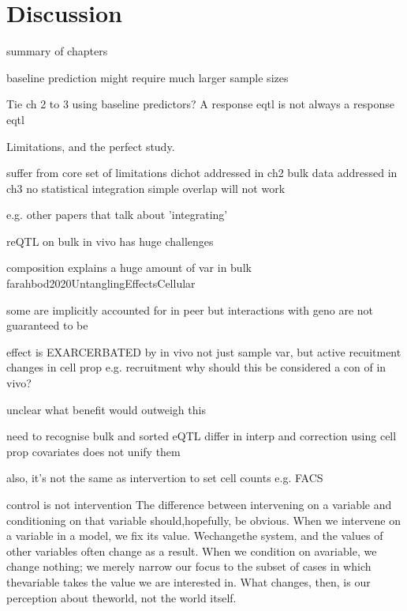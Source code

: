 %
%

\chapter{Discussion}

\begin{outline}

summary of chapters

    baseline prediction might require much larger sample sizes

    Tie ch 2 to 3 using baseline predictors?
    A response eqtl is not always a response eqtl

    Limitations, and the perfect study.

suffer from core set of limitations 
    dichot
        addressed in ch2
    bulk data
        addressed in ch3
    no statistical integration
        simple overlap will not work

        e.g. other papers that talk about 'integrating'

reQTL on bulk in vivo has huge challenges

    composition explains a huge amount of var in bulk farahbod2020UntanglingEffectsCellular

    some are implicitly accounted for in peer
        but interactions with geno are not guaranteed to be

    effect is EXARCERBATED by in vivo
        not just sample var, but active recuitment changes in cell prop e.g. recruitment
            why should this be considered a con of in vivo?

    unclear what benefit would outweigh this

need to recognise 
    bulk and sorted eQTL differ in interp
        and correction using cell prop covariates does not unify them

    also, it's not the same as intervertion to set cell counts e.g. FACS

        control is not intervention
            The difference between intervening on a variable and conditioning on that
            variable should,hopefully, be obvious. When we intervene on a variable in a
            model, we fix its value. Wechangethe system, and the values of other variables
            often change as a result. When we condition on avariable, we change nothing; we
            merely narrow our focus to the subset of cases in which thevariable takes the
            value we are interested in. What changes, then, is our perception about
            theworld, not the world itself.


\end{outline}

